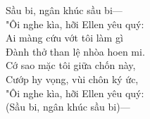 \noindent
Sầu bi, ngân khúc sầu bi—\\
\indent
"Ôi nghe kìa, hỡi Ellen yêu quý:\\
Ai màng cứu vớt tôi làm gì\\
\indent
Đành thở than lệ nhòa hoen mi.\\
Cớ sao mặc tôi giữa chốn này,\\
\indent
Cướp hy vọng, vùi chôn ký ức,\\
"Ôi nghe kìa, hỡi Ellen yêu quý:\\
\indent
(Sầu bi, ngân khúc sầu bi)—\\